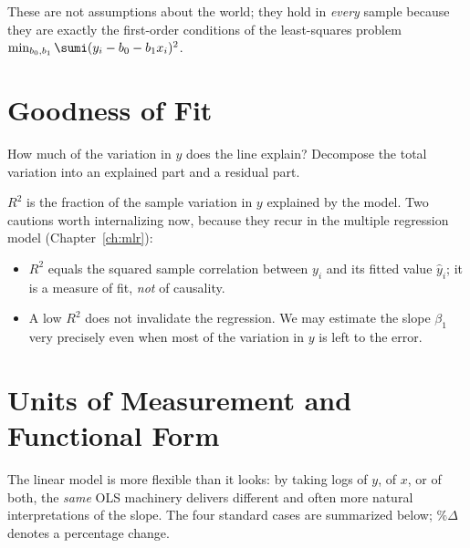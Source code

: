 These are not assumptions about the world; they hold in \emph{every} sample because they are exactly the first-order conditions of the least-squares problem $\min_{b_0,b_1}\sumi (y_i - b_0 - b_1 x_i)^2$.

\section{Goodness of Fit}

How much of the variation in $y$ does the line explain? Decompose the total variation into an explained part and a residual part.


$R^2$ is the fraction of the sample variation in $y$ explained by the model. Two cautions worth internalizing now, because they recur in the multiple regression model (Chapter~\ref{ch:mlr}):
\begin{itemize}
    \item $R^2$ equals the squared sample correlation between $y_i$ and its fitted value $\hat y_i$; it is a measure of fit, \emph{not} of causality.
    \item A low $R^2$ does not invalidate the regression. We may estimate the slope $\beta_1$ very precisely even when most of the variation in $y$ is left to the error.
\end{itemize}

\section{Units of Measurement and Functional Form}

The linear model is more flexible than it looks: by taking logs of $y$, of $x$, or of both, the \emph{same} OLS machinery delivers different and often more natural interpretations of the slope. The four standard cases are summarized below; $\%\Delta$ denotes a percentage change.

